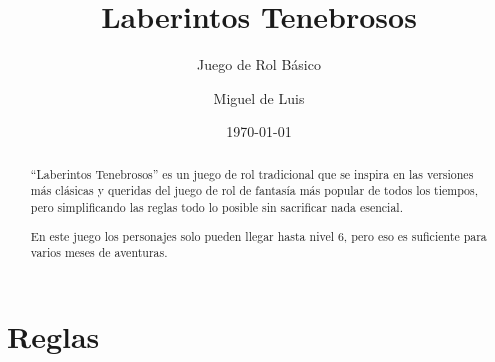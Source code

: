 



\title{Laberintos Tenebrosos}
\subtitle{Juego de Rol Básico}
\author{Miguel de Luis}
\dedication{Para Alberto, Alexis, Dimas, Luis y Quintín y quienes la magia amen\dots}
\date{\today}
\maketitle
\begin{multicols}{2}
\tableofcontents
\end{multicols}
\pagebreak
\vfill
\begin{multicols}{2}

\listoftables

\end{multicols}
\vfill
\pagebreak


\part{Reglas}

\begin{abstract}
\noindent \enquote{Laberintos Tenebrosos} es un juego de rol tradicional que se inspira en
las versiones más clásicas y queridas del juego de rol de fantasía más popular
de todos los tiempos, pero simplificando las reglas todo lo posible sin sacrificar nada esencial.

En este juego los personajes solo pueden llegar hasta nivel 6, pero eso es
suficiente para varios meses de aventuras.
\end{abstract}

\vspace{1cm}

